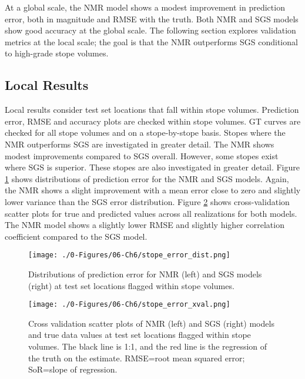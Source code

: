 At a global scale, the \gls{NMR} model shows a modest improvement in prediction error, both in magnitude and \gls{RMSE} with the truth. Both \gls{NMR} and \gls{SGS} models show good accuracy at the global scale. The following section explores validation metrics at the local scale; the goal is that the \gls{NMR} outperforms \gls{SGS} conditional to high-grade stope volumes.

\FloatBarrier
\subsection{Local Results}
\label{subsec:06local}

Local results consider test set locations that fall within stope volumes. Prediction error, \gls{RMSE} and accuracy plots are checked within stope volumes. \Gls{GT} curves are checked for all stope volumes and on a stope-by-stope basis. Stopes where the \gls{NMR} outperforms \gls{SGS} are investigated in greater detail. The \gls{NMR} shows modest improvements compared to \gls{SGS} overall. However, some stopes exist where \gls{SGS} is superior. These stopes are also investigated in greater detail. Figure \ref{fig:stope_error_dist} shows distributions of prediction error for the \gls{NMR} and \gls{SGS} models. Again, the \gls{NMR} shows a slight improvement with a mean error close to zero and slightly lower variance than the \gls{SGS} error distribution. Figure \ref{fig:stope_error_xval} shows cross-validation scatter plots for true and predicted values across all realizations for both models. The \gls{NMR} model shows a slightly lower \gls{RMSE} and slightly higher correlation coefficient compared to the \gls{SGS} model.

\begin{figure}[htb!]
    \centering
    \texttt{[image: ./0-Figures/06-Ch6/stope\_error\_dist.png]}
    \caption{Distributions of prediction error for \gls{NMR} (left) and \gls{SGS} models (right) at test set locations flagged within stope volumes. }
    \label{fig:stope_error_dist}
\end{figure}

\begin{figure}[htb!]
    \centering
    \texttt{[image: ./0-Figures/06-Ch6/stope\_error\_xval.png]}
    \caption{Cross validation scatter plots of  \gls{NMR} (left) and \gls{SGS} (right) models and true data values at test set locations flagged within stope volumes. The black line is 1:1, and the red line is the regression of the truth on the estimate. RMSE=root mean squared error; SoR=slope of regression.}
    \label{fig:stope_error_xval}
\end{figure}

